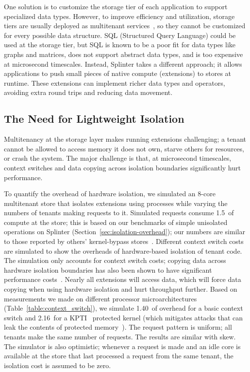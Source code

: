 One solution is to customize the storage tier of each application to
support specialized data types. However, to improve efficiency and
utilization, storage tiers are usually deployed as multitenant
services~\cite{bigtable-2008,dynamo}, so they cannot be
customized for every possible data structure.
SQL (Structured Query Language) could be used at the storage tier, but
SQL is known to be a poor fit for data
types like graphs and matrices, does not support abstract data types,
and is too expensive at microsecond timescales. Instead,
Splinter takes a different approach;
it allows applications to push small pieces of native compute (extensions)
to stores at runtime. These extensions can
implement richer data types and operators, avoiding extra round trips
and reducing data movement.

\subsection{The Need for Lightweight Isolation}
Multitenancy at the storage layer makes running extensions challenging;
    a tenant cannot be allowed to access memory it does not own, starve
    others for resources, or crash the system.
The major challenge is that, at microsecond timescales, context switches and
    data copying across isolation boundaries significantly hurt performance.

To quantify the overhead of hardware isolation, we simulated an
  8-core multitenant store that isolates extensions using
  processes while varying the numbers of tenants making requests to it.
Simulated requests consume 1.5~\us of compute at the store; this
  is based on our benchmarks of simple unisolated operations on Splinter
  (Section~\ref{sec:isolation-overhead}); our numbers are similar to those reported
  by others' kernel-bypass stores~\cite{ramcloud}.
Different context switch costs are simulated to show the
  overheads of hardware-based isolation of tenant code.
The simulation only accounts for context switch costs;
copying data across hardware isolation boundaries has also been shown to have
  significant performance costs~\cite{netbricks-2016}.
Nearly all extensions will access data, which will force data copying
  when using hardware isolation and hurt throughput further.
Based on measurements we made on different processor microarchitectures
  (Table~\ref{table:context_switch}), we simulate
  1.40~\us of overhead for a basic context switch and 2.16~\us for a
  KPTI~\cite{kpti-2018} protected kernel (which mitigates attacks
  that can leak the contents of protected memory~\cite{meltdown-2018}).
The request pattern is uniform;
all tenants make the same number of requests. The results are similar
  with skew.
The simulator is also optimistic; whenever a request is made and an idle core
  is available at the store that last processed a request from the same tenant,
  the isolation cost is assumed to be zero.

